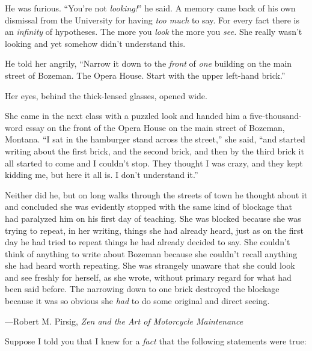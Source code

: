 {
 He was furious. ``You're not
\textit{looking!}'' he said. A memory came back of
his own dismissal from the University for having \textit{too much} to
say. For every fact there is an \textit{infinity} of hypotheses. The
more you \textit{look} the more you \textit{see.} She really
wasn't looking and yet somehow didn't
understand this.}

{
 He told her angrily, ``Narrow it down to the
\textit{front} of \textit{one} building on the main street of Bozeman.
The Opera House. Start with the upper left-hand
brick.''}

{
 Her eyes, behind the thick-lensed glasses, opened wide.}

{
 She came in the next class with a puzzled look and handed him a
five-thousand-word essay on the front of the Opera House on the main
street of Bozeman, Montana. ``I sat in the hamburger
stand across the street,'' she said,
``and started writing about the first brick, and the
second brick, and then by the third brick it all started to come and I
couldn't stop. They thought I was crazy, and they kept
kidding me, but here it all is. I don't understand
it.''}

{
 Neither did he, but on long walks through the streets of town he
thought about it and concluded she was evidently stopped with the same
kind of blockage that had paralyzed him on his first day of teaching.
She was blocked because she was trying to repeat, in her writing,
things she had already heard, just as on the first day he had tried to
repeat things he had already decided to say. She
couldn't think of anything to write about Bozeman
because she couldn't recall anything she had heard
worth repeating. She was strangely unaware that she could look and see
freshly for herself, as she wrote, without primary regard for what had
been said before. The narrowing down to one brick destroyed the
blockage because it was so obvious she \textit{had} to do some original
and direct seeing.}

{\raggedleft
 {}---Robert M. Pirsig,\newline
 \textit{Zen and the Art of Motorcycle Maintenance}
\par}


\bigskip

\myendsectiontext


\bigskip


{
 Suppose I told you that I knew for a \textit{fact} that the
following statements were true:}

